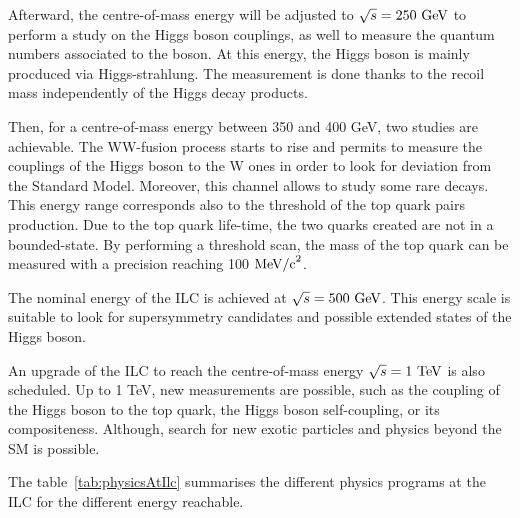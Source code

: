    Afterward, the centre-of-mass energy will be adjusted to $\sqrt{s} = 250~\rm{GeV}$ to perform a study on the Higgs boson couplings, as well to measure the quantum numbers associated to the boson.
   At this energy, the Higgs boson is mainly procduced via Higgs-strahlung.
   The measurement is done thanks to the recoil mass independently of the Higgs decay products.
 
   Then, for a centre-of-mass energy between 350 and 400 GeV, two studies are achievable. 
   The WW-fusion process starts to rise and permits to measure the couplings of the Higgs boson to the W ones in order to look for deviation from the Standard Model. 
   Moreover, this channel allows to study some rare decays. 
   This energy range corresponds also to the threshold of the top quark pairs production.
   Due to the top quark life-time, the two quarks created are not in a bounded-state.
   By performing a threshold scan, the mass of the top quark can be measured with a precision reaching 100 $\rm{MeV/c}^2$.

   The nominal energy of the \gls{ILC} is achieved at $\sqrt{s} = 500~\rm{GeV}$.
   This energy scale is suitable to look for supersymmetry candidates and possible extended states of the Higgs boson.

   An upgrade of the ILC to reach the centre-of-mass energy $\sqrt{s} = 1~\rm{TeV}$ is also scheduled.
   Up to 1 TeV, new measurements are possible, such as the coupling of the Higgs boson to the top quark, the Higgs boson self-coupling, or its compositeness.
   Although, search for new exotic particles and physics beyond the \gls{SM} is possible.
    
   The table~\ref{tab:physicsAtIlc} summarises the different physics programs at the \gls{ILC} for the different energy reachable.  

